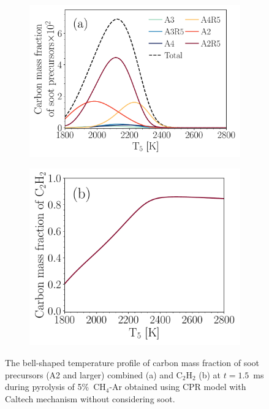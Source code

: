 \begin{figure}[H]
	\centering
	\begin{subfigure}[t]{0.4\textwidth}
		\includegraphics[width=1\textwidth]{Figures/Results/Shocktube/Agafonov2016_cpr/SPC_cmf_separate.pdf}
	\end{subfigure}
	\begin{subfigure}[t]{0.36\textwidth}
		\includegraphics[width=1\textwidth]{Figures/Results/Shocktube/Agafonov2016_cpr/C2H2_cmf.pdf}
	\end{subfigure}
	\caption{The bell-shaped temperature profile of carbon mass fraction of soot precursors (A2 and larger) combined (a) and $\mathrm{C_2H_2}$ (b) at $t=1.5$~ms during pyrolysis of 5\%~$\mathrm{CH_4}$-Ar obtained using CPR model with Caltech mechanism without considering soot.}
	\label{fig:SPC_cmf_cpr} 
\end{figure}





